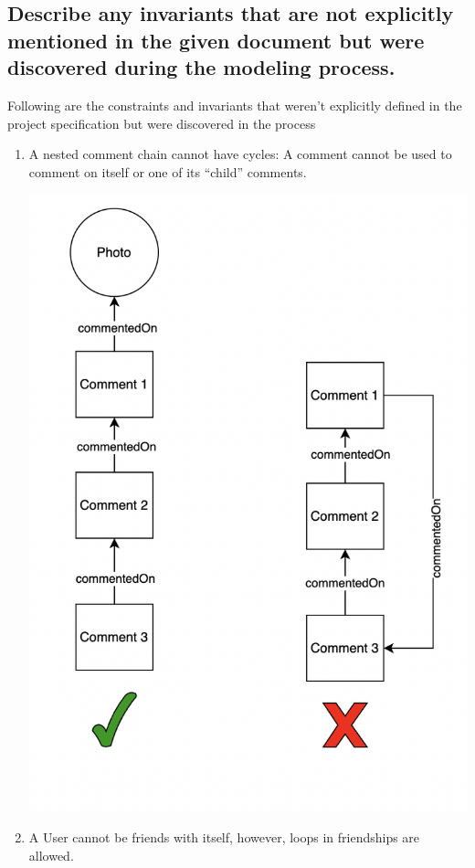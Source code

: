 \documentclass[titlepage]{article}
\begin{document}
\subsection{Describe any invariants that are not explicitly mentioned in the given document but were discovered during the modeling process.}
Following are the constraints and invariants that weren’t explicitly defined in the project specification but were discovered in the process
\begin{enumerate}
	\clearpage\item A nested comment chain cannot have cycles: A comment cannot be used to comment on itself or one of its “child” comments.

	      \includegraphics[width=5in]{images/invariant_1.png}

	      \clearpage\item A User cannot be friends with itself, however, loops in friendships are allowed.


\end{enumerate}
\end{document}
